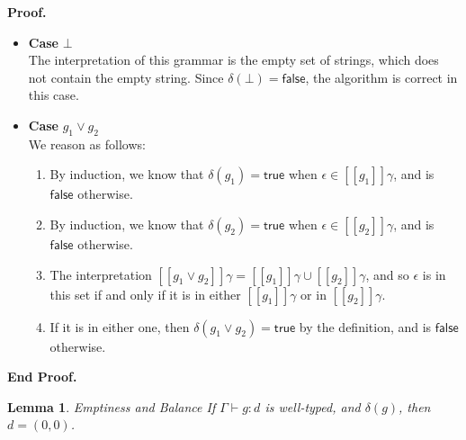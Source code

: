\documentclass{article}
\newcommand{\judgebalance}[3][\Gamma]{{#1} \vdash {#2} : {#3}}
\newcommand{\true}{\mathsf{true}}
\newcommand{\false}{\mathsf{false}}
\newcommand{\zero}{(0,0)}
\newcommand{\interp}[1]{[\![{#1}]\!]}
\newcommand{\emptify}[1]{\delta({#1})}
\newtheorem{lemma}{Lemma}
\newenvironment{proof}{\noindent\textbf{Proof.}}{\noindent\textbf{End Proof.}}
\newenvironment{caseblock}{\begin{itemize}}{\end{itemize}}
\newenvironment{case}[1]{\item \textbf{Case} {#1}\\}{}
\begin{document}
\begin{proof}
\begin{caseblock}
  \begin{case}{$\bot$}
    The interpretation of this grammar is the empty set of strings, which does not
    contain the empty string. Since $\emptify{\bot} = \false$, the algorithm is correct in
    this case. 
  \end{case}

  \begin{case}{$g_1 \vee g_2$}
    We reason as follows:
    \begin{enumerate}
      \item By induction, we know that $\emptify{g_1} = \true$ when $\epsilon \in \interp{g_1}\gamma$, 
        and is $\false$  otherwise. 
      \item By induction, we know that $\emptify{g_2} = \true$ when $\epsilon \in \interp{g_2}\gamma$, 
        and is $\false$  otherwise. 
      \item The interpretation $\interp{g_1 \vee g_2}\gamma = \interp{g_1}\gamma \cup \interp{g_2}\gamma$,  
        and so $\epsilon$ is in this set if and only if it is in either $\interp{g_1}\gamma$ or in 
        $\interp{g_2}\gamma$.
      \item If it is in either one, then $\emptify{g_1 \vee g_2} = \true$ by the definition, and is 
        $\false$ otherwise. 
    \end{enumerate}
  \end{case}
\end{caseblock}
\end{proof}

\begin{lemma}{Emptiness and Balance}
If $\judgebalance{g}{d}$ is well-typed, and $\emptify{g}$, then $d = \zero$. 
\end{lemma}
\end{document}
